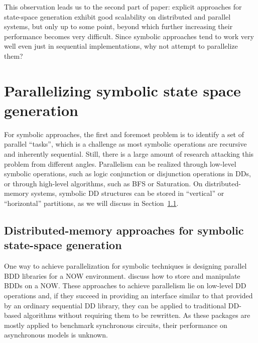 \documentclass[copyright,creativecommons]{eptcs}
\begin{document}
This observation leads us to the second part of paper:
explicit approaches for state-space generation exhibit good scalability on
distributed and parallel systems, but only up to some point,
beyond which further increasing their performance becomes very difficult.
Since symbolic approaches tend to work very well even just in sequential
implementations, why not attempt to parallelize them?
 
\section{Parallelizing symbolic state space generation}
\label{sec:implicit}

For symbolic approaches, the first and foremost problem is to identify
a set of parallel ``tasks'', which is a challenge as most symbolic
operations are recursive and inherently sequential.
Still, there is a large amount of research attacking this problem from
different angles.
Parallelism can be realized through low-level symbolic operations, such
as logic conjunction or disjunction operations in DDs, or through high-level
algorithms, such as BFS or Saturation.
On distributed-memory systems, symbolic DD structures can be
stored in ``vertical'' or ``horizontal'' partitions, as we will
discuss in Section~\ref{sec:dis}.


\subsection{Distributed-memory approaches for symbolic state-space generation}
\label{sec:dis}

One way to achieve parallelization for symbolic techniques is designing
parallel BDD libraries for a NOW environment.
\cite{Milvang1998,Ranjan1996,Stornetta1996} discuss how to store and
manipulate BDDs on a NOW.
These approaches to achieve parallelism lie on low-level DD operations and,
if they succeed in providing an interface similar to that provided
by an ordinary sequential DD library, they can be applied to traditional
DD-based algorithms without requiring them to be rewritten.
As these packages are mostly applied to benchmark synchronous circuits,
their performance on asynchronous models is unknown.
\end{document}
